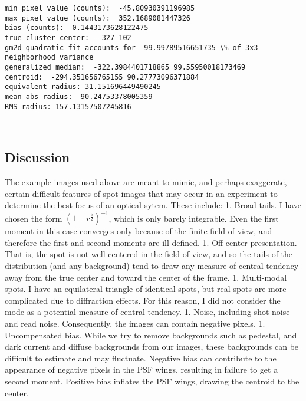 \documentclass[11pt]{article}
\begin{document}
    \begin{Verbatim}[commandchars=\\\{\}]
min pixel value (counts):  -45.80930391196985
max pixel value (counts):  352.1689081447326
bias (counts):  0.1443173628122475
true cluster center:  -327 102
gm2d quadratic fit accounts for  99.99789516651735 \% of 3x3 neighborhood variance
generalized median:  -322.3984401718865 99.55950018173469
centroid:  -294.351656765155 90.27773096371884
equivalent radius: 31.151696449490245
mean abs radius:  90.24753378005359
RMS radius: 157.13157507245816

    \end{Verbatim}

    \begin{center}
    \end{center}
    { \hspace*{\fill} \\}
    
    \subsection{Discussion}\label{discussion}

The example images used above are meant to mimic, and perhaps
exaggerate, certain difficult features of spot images that may occur in
an experiment to determine the best focus of an optical sytem. These
include: 1. Broad tails. I have chosen the form
\(\left( 1 + r^{\frac{5}{2}} \right)^{-1}\), which is only barely
integrable. Even the first moment in this case converges only because of
the finite field of view, and therefore the first and second moments are
ill-defined. 1. Off-center presentation. That is, the spot is not well
centered in the field of view, and so the tails of the distribution (and
any background) tend to draw any measure of central tendency away from
the true center and toward the center of the frame. 1. Multi-modal
spots. I have an equilateral triangle of identical spots, but real spots
are more complicated due to diffraction effects. For this reason, I did
not consider the mode as a potential measure of central tendency. 1.
Noise, including shot noise and read noise. Consequently, the images can
contain negative pixels. 1. Uncompensated bias. While we try to remove
backgrounds such as pedestal, and dark current and diffuse backgrounds
from our images, these backgrounds can be difficult to estimate and may
fluctuate. Negative bias can contribute to the appearance of negative
pixels in the PSF wings, resulting in failure to get a second moment.
Positive bias inflates the PSF wings, drawing the centroid to the
center.
\end{document}
